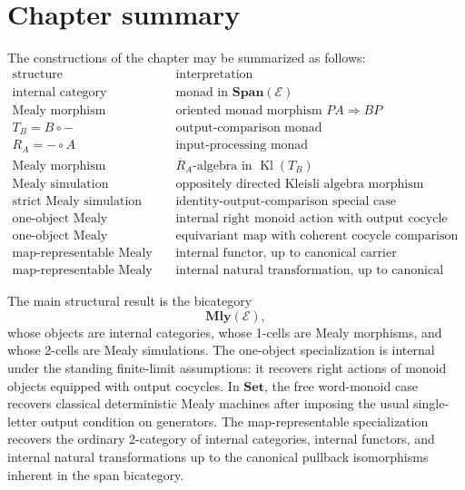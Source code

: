 \section{Chapter summary}
\label{sec:chapter-summary}

The constructions of the chapter may be summarized as follows:
\[
\begin{array}{c|l}
\text{structure} & \text{interpretation} \\
\hline
\text{internal category}
&
\text{monad in }\mathbf{Span}(\mathcal E)
\\
\text{Mealy morphism}
&
\text{oriented monad morphism }P A\Rightarrow B P
\\
T_B=B\circ -
&
\text{output-comparison monad}
\\
R_A=-\circ A
&
\text{input-processing monad}
\\
\text{Mealy morphism}
&
\overline R_A\text{-algebra in }\operatorname{Kl}(T_B)
\\
\text{Mealy simulation}
&
\text{oppositely directed Kleisli algebra morphism}
\\
\text{strict Mealy simulation}
&
\text{identity-output-comparison special case}
\\
\text{one-object Mealy morphism}
&
\text{internal right monoid action with output cocycle}
\\
\text{one-object Mealy simulation}
&
\text{equivariant map with coherent cocycle comparison}
\\
\text{map-representable Mealy morphism}
&
\text{internal functor, up to canonical carrier isomorphism}
\\
\text{map-representable Mealy simulation}
&
\text{internal natural transformation, up to canonical carrier isomorphism.}
\end{array}
\]

The main structural result is the bicategory
\[
    \mathbf{Mly}(\mathcal E),
\]
whose objects are internal categories, whose 1-cells are Mealy morphisms, and
whose 2-cells are Mealy simulations. The one-object specialization is internal
under the standing finite-limit assumptions: it recovers right actions of
monoid objects equipped with output cocycles. In \(\mathbf{Set}\), the free
word-monoid case recovers classical deterministic Mealy machines after imposing
the usual single-letter output condition on generators. The map-representable
specialization recovers the ordinary 2-category of internal categories,
internal functors, and internal natural transformations up to the canonical
pullback isomorphisms inherent in the span bicategory.
